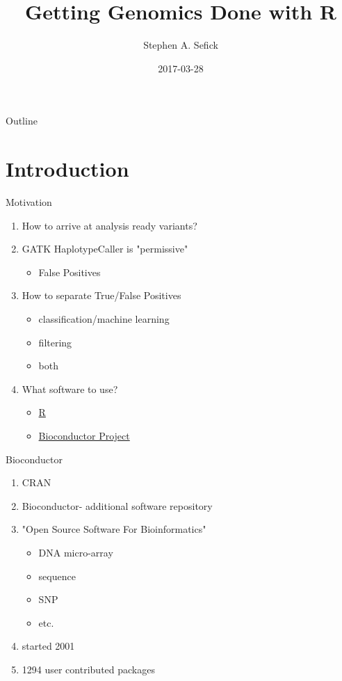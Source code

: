 \documentclass[t,10pt]{beamer}
\author{Stephen A. Sefick}
\date{2017-03-28}
\title{Getting Genomics Done with R}
\begin{document}
\maketitle
\begin{frame}{Outline}
\tableofcontents
\end{frame}



\section{Introduction}
\label{sec:orgheadline4}
\begin{frame}[label={sec:orgheadline1}]{Motivation}
\begin{enumerate}[<+->]
\item How to arrive at analysis ready variants?
\item GATK HaplotypeCaller is "permissive"
\begin{itemize}
\item False Positives
\end{itemize}
\item How to separate True/False Positives
\begin{itemize}
\item classification/machine learning
\item \alert{filtering}
\item both
\end{itemize}
\item What software to use?
\begin{itemize}
\item \href{https://cran.r-project.org/}{R}
\item \href{https://bioconductor.org/}{Bioconductor Project}
\end{itemize}
\end{enumerate}
\end{frame}

\begin{frame}[label={sec:orgheadline2}]{Bioconductor}
\begin{enumerate}[<+->]
\item CRAN
\item Bioconductor- additional software repository
\item "Open Source Software For Bioinformatics"
\begin{itemize}
\item DNA micro-array
\item sequence
\item SNP
\item etc.
\end{itemize}
\item started 2001
\item 1294 user contributed packages
\end{enumerate}
\end{frame}
\end{document}
